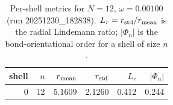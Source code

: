 \begin{table}[t]
\centering
\small
\setlength{\tabcolsep}{4pt}
\renewcommand{\arraystretch}{1.15}
\begin{tabular}{r r r r r r}
\toprule
shell & $n$ & $r_{\rm mean}$ & $r_{\rm std}$ & $L_r$ & $|\Phi_n|$ \\
\midrule
0 & 12 & 5.1609 & 2.1260 & 0.412 & 0.244 \\
\bottomrule
\end{tabular}
\caption{Per-shell metrics for $N=12$, $\omega=0.00100$ (run 20251230_182838). $L_r=r_{\rm std}/r_{\rm mean}$ is the radial Lindemann ratio; $|\Phi_n|$ is the bond-orientational order for a shell of size $n$.}
\end{table}